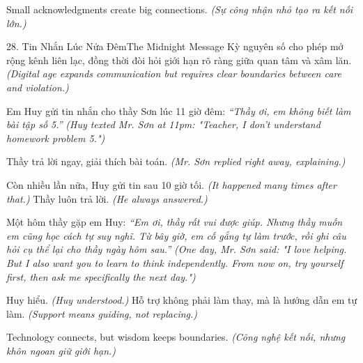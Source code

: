 \begin{ghinhoanh}
Small acknowledgments create big connections.
\textit{(Sự công nhận nhỏ tạo ra kết nối lớn.)}
\end{ghinhoanh}

\begin{truyen}{28. Tin Nhắn Lúc Nửa Đêm}{The Midnight Message}
Kỳ nguyên số cho phép mở rộng kênh liên lạc, đồng thời đòi hỏi giới hạn rõ ràng giữa quan tâm và xâm lăn.
\textit{(Digital age expands communication but requires clear boundaries between care and violation.)}

Em Huy gửi tin nhắn cho thầy Sơn lúc 11 giờ đêm: \textit{``Thầy ơi, em không biết làm bài tập số 5.''}
\textit{(Huy texted Mr. Sơn at 11pm: "Teacher, I don't understand homework problem 5.")}

Thầy trả lời ngay, giải thích bài toán.
\textit{(Mr. Sơn replied right away, explaining.)}

Còn nhiều lần nữa, Huy gửi tin sau 10 giờ tối.
\textit{(It happened many times after that.)}
Thầy luôn trả lời.
\textit{(He always answered.)}

Một hôm thầy gặp em Huy: \textit{``Em ơi, thầy rất vui được giúp. Nhưng thầy muốn em cũng học cách tự suy nghĩ. Từ bây giờ, em cố gắng tự làm trước, rồi ghi câu hỏi cụ thể lại cho thầy ngày hôm sau.''}
\textit{(One day, Mr. Sơn said: "I love helping. But I also want you to learn to think independently. From now on, try yourself first, then ask me specifically the next day.")}

Huy hiểu.
\textit{(Huy understood.)}
Hỗ trợ không phải làm thay, mà là hướng dẫn em tự làm.
\textit{(Support means guiding, not replacing.)}
\end{truyen}

\begin{baihoc}
Technology connects, but wisdom keeps boundaries.
\textit{(Công nghệ kết nối, nhưng khôn ngoan giữ giới hạn.)}
\end{baihoc}

